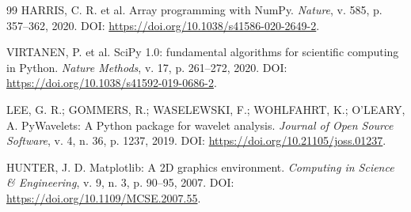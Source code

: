 \begin{thebibliography}{99}
 HARRIS, C. R. et al. Array programming with NumPy. \textit{Nature}, v. 585, p. 357--362, 2020. DOI: \url{https://doi.org/10.1038/s41586-020-2649-2}.

 VIRTANEN, P. et al. SciPy 1.0: fundamental algorithms for scientific computing in Python. \textit{Nature Methods}, v. 17, p. 261--272, 2020. DOI: \url{https://doi.org/10.1038/s41592-019-0686-2}.

 LEE, G. R.; GOMMERS, R.; WASELEWSKI, F.; WOHLFAHRT, K.; O'LEARY, A. PyWavelets: A Python package for wavelet analysis. \textit{Journal of Open Source Software}, v. 4, n. 36, p. 1237, 2019. DOI: \url{https://doi.org/10.21105/joss.01237}.

 HUNTER, J. D. Matplotlib: A 2D graphics environment. \textit{Computing in Science \& Engineering}, v. 9, n. 3, p. 90--95, 2007. DOI: \url{https://doi.org/10.1109/MCSE.2007.55}.

\end{thebibliography}


